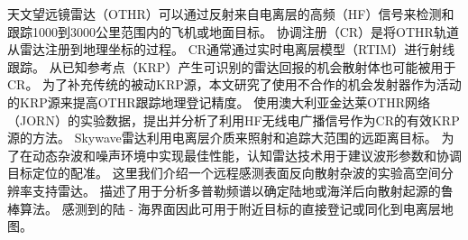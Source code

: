 天文望远镜雷达（OTHR）\cite{fabrizio2016using}可以通过反射来自电离层的高频（HF）信号来检测和跟踪1000到3000公里范围内的飞机或地面目标。 协调注册（CR）是将OTHR轨道从雷达注册到地理坐标的过程。 CR通常通过实时电离层模型（RTIM）进行射线跟踪。 从已知参考点（KRP）产生可识别的雷达回报的机会散射体也可能被用于CR。 为了补充传统的被动KRP源，本文研究了使用不合作的机会发射器作为活动的KRP源来提高OTHR跟踪地理登记精度。 使用澳大利亚金达莱OTHR网络（JORN）的实验数据，提出并分析了利用HF无线电广播信号作为CR的有效KRP源的方法。
Skywave雷达利用电离层介质来照射和追踪大范围的远距离目标\cite{turley2013high}。 为了在动态杂波和噪声环境中实现最佳性能，认知雷达技术用于建议波形参数和协调目标定位的配准。 这里我们介绍一个远程感测表面反向散射杂波的实验高空间分辨率支持雷达。 描述了用于分析多普勒频谱以确定陆地或海洋后向散射起源的鲁棒算法。 感测到的陆 - 海界面因此可用于附近目标的直接登记或同化到电离层地图。
